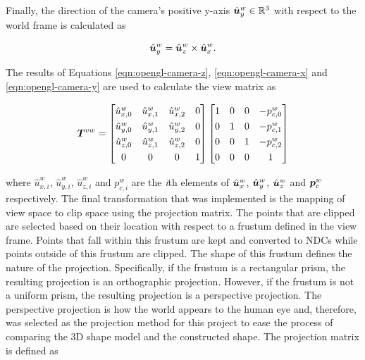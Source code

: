 Finally, the direction of the camera's positive y-axis $\hat{\bm{u}}^w_y\in\mathbb{R}^3$ with respect to the world frame is calculated as

\begin{equation}
	\hat{\bm{u}}^w_y=\hat{\bm{u}}^w_z\times\hat{\bm{u}}^w_x.
	\label{eqn:opengl-camera-y}
\end{equation}

The results of Equations \ref{eqn:opengl-camera-z}, \ref{eqn:opengl-camera-x} and \ref{eqn:opengl-camera-y} are used to calculate the view matrix as

\begin{equation}
	\renewcommand*{\arraystretch}{1.3}
	\matr{T}^{vw}=
	\begin{bmatrix}
		\hat{u}^w_{x,0} & \hat{u}^w_{x,1} & \hat{u}^w_{x,2} & 0 \\
		\hat{u}^w_{y,0} & \hat{u}^w_{y,1} & \hat{u}^w_{y,2} & 0 \\
		\hat{u}^w_{z,0} & \hat{u}^w_{z,1} & \hat{u}^w_{z,2} & 0 \\
		0 & 0 & 0 & 1
	\end{bmatrix}
	\begin{bmatrix}
		1 & 0 & 0 & -p^w_{c,0} \\
		0 & 1 & 0 & -p^w_{c,1} \\
		0 & 0 & 1 & -p^w_{c,2} \\
		0 & 0 & 0 & 1
	\end{bmatrix}
\end{equation}

where $\hat{u}^w_{x,i}$, $\hat{u}^w_{y,i}$, $\hat{u}^w_{z,i}$ and $p^w_{c,i}$ are the \textit{i}th elements of $\hat{\bm{u}}^w_{x}$, $\hat{\bm{u}}^w_{y}$, $\hat{\bm{u}}^w_{z}$ and $\bm{p}^w_{c}$ respectively. The final transformation that was implemented is the mapping of view space to clip space using the projection matrix. The points that are clipped are selected based on their location with respect to a frustum defined in the view frame. Points that fall within this frustum are kept and converted to NDCs while points outside of this frustum are clipped. The shape of this frustum defines the nature of the projection. Specifically, if the frustum is a rectangular prism, the resulting projection is an orthographic projection. However, if the frustum is not a uniform prism, the resulting projection is a perspective projection. The perspective projection is how the world appears to the human eye and, therefore, was selected as the projection method for this project to ease the process of comparing the 3D shape model and the constructed shape. The projection matrix is defined as

